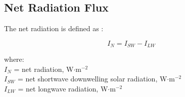 \subsection{Net Radiation Flux}
\label{sec:rn}
The net radiation is defined as \parencite[Eq. 4]{linacre68}:

\begin{equation}
\label{eq:rn}
	I_N = I_{SW} - I_{LW}
\end{equation}

\noindent where: \\
\indent $I_N$ = net radiation, W$\cdot$m$^{-2}$ \\
\indent $I_{SW}$ = net shortwave downwelling solar radiation, W$\cdot$m$^{-2}$ \\
\indent $I_{LW}$ = net longwave radiation, W$\cdot$m$^{-2}$ \\

